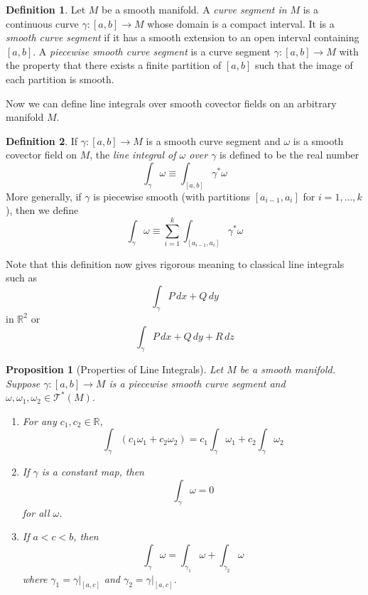 \documentclass{article}
\newtheorem{proposition}[theorem]{Proposition}
\theoremstyle{remark}
\theoremstyle{definition}
\newtheorem{definition}{Definition}[section]
\begin{document}
\begin{definition}
Let $M$ be a smooth manifold. A \textit{curve segment in $M$} is a continuous curve $\gamma: [a,b] \longrightarrow M$ whose domain is a compact interval. It is a \textit{smooth curve segment} if it has a smooth extension to an open interval containing $[a,b]$. A \textit{piecewise smooth curve segment} is a curve segment $\gamma: [a,b] \longrightarrow M$ with the property that there exists a finite partition of $[a,b]$ such that the image of each partition is smooth. 
\end{definition}

Now we can define line integrals over smooth covector fields on an arbitrary manifold $M$. 

\begin{definition}
If $\gamma: [a,b] \longrightarrow M$ is a smooth curve segment and $\omega$ is a smooth covector field on $M$, the \textit{line integral of $\omega$ over $\gamma$} is defined to be the real number
\[\int_\gamma \omega \equiv \int_{[a,b]} \gamma^* \omega\]
More generally, if $\gamma$ is piecewise smooth (with partitions $[a_{i-1}, a_i]$ for $i = 1, ..., k$), then we define
\[\int_\gamma \omega \equiv \sum_{i=1}^k \int_{[a_{i-1}, a_i]} \gamma^* \omega\]
\end{definition}

Note that this definition now gives rigorous meaning to classical line integrals such as 
\[\int_\gamma P \,dx + Q\,dy\]
in $\mathbb{R}^2$ or 
\[\int_\gamma P\,dx + Q\,dy + R\,dz\]

\begin{proposition}[Properties of Line Integrals]
Let $M$ be a smooth manifold. Suppose $\gamma: [a,b] \longrightarrow M$ is a piecewise smooth curve segment and $\omega, \omega_1, \omega_2 \in \mathcal{T}^* (M)$. 
\begin{enumerate}
    \item For any $c_1, c_2 \in \mathbb{R}$, 
    \[\int_\gamma (c_1 \omega_1 + c_2 \omega_2) = c_1 \int_\gamma \omega_1 + c_2 \int_\gamma \omega_2\]
    \item If $\gamma$ is a constant map, then 
    \[\int_\gamma \omega = 0\]
    for all $\omega$. 
    \item If $a < c < b$, then 
    \[\int_\gamma \omega = \int_{\gamma_1} \omega + \int_{\gamma_2} \omega\]
    where $\gamma_1 = \gamma \big|_{[a,c]}$ and $\gamma_2 = \gamma \big|_{[a,c]}$. 
\end{enumerate}
\end{proposition}
\end{document}
